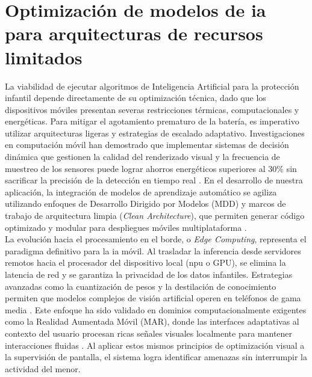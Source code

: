 \section{Optimización de modelos de \gls{ia} para arquitecturas de recursos limitados}

La viabilidad de ejecutar algoritmos de Inteligencia Artificial para la protección infantil depende directamente de su optimización técnica, dado que los dispositivos móviles presentan severas restricciones térmicas, computacionales y energéticas. Para mitigar el agotamiento prematuro de la batería, es imperativo utilizar arquitecturas ligeras y estrategias de escalado adaptativo. Investigaciones en computación móvil han demostrado que implementar sistemas de decisión dinámica que gestionen la calidad del renderizado visual y la frecuencia de muestreo de los sensores puede lograr ahorros energéticos superiores al 30\% sin sacrificar la precisión de la detección en tiempo real \cite{ali_efficient_2021}. En el desarrollo de nuestra aplicación, la integración de modelos de aprendizaje automático se agiliza utilizando enfoques de Desarrollo Dirigido por Modelos (MDD) y marcos de trabajo de arquitectura limpia (\textit{Clean Architecture}), que permiten generar código optimizado y modular para despliegues móviles multiplataforma \cite{alwakeel_appcraft_2025}.\\

La evolución hacia el procesamiento en el borde, o \textit{Edge Computing}, representa el paradigma definitivo para la \gls{ia} móvil. Al trasladar la inferencia desde servidores remotos hacia el procesador del dispositivo local (\gls{npu} o GPU), se elimina la latencia de red y se garantiza la privacidad de los datos infantiles. Estrategias avanzadas como la cuantización de pesos y la destilación de conocimiento permiten que modelos complejos de visión artificial operen en teléfonos de gama media \cite{surianarayanan_survey_2023}. Este enfoque ha sido validado en dominios computacionalmente exigentes como la Realidad Aumentada Móvil (MAR), donde las interfaces adaptativas al contexto del usuario procesan ricas señales visuales localmente para mantener interacciones fluidas \cite{cao_mobile_2023}. Al aplicar estos mismos principios de optimización visual a la supervisión de pantalla, el sistema logra identificar amenazas sin interrumpir la actividad del menor.\\


